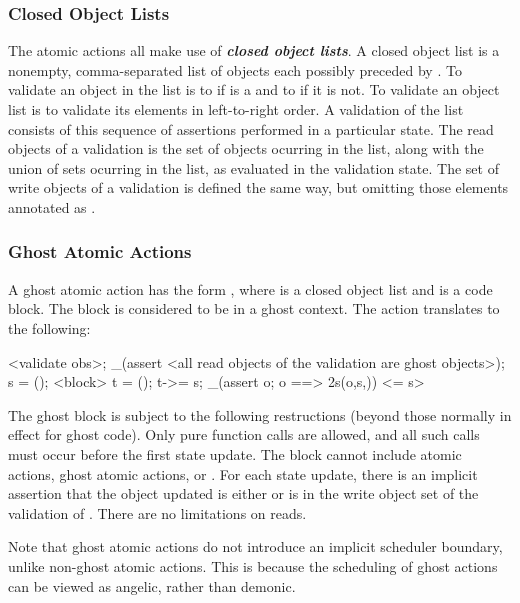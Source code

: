 \documentclass[preprint,nocopyrightspace]{sigplanconf}
\newcommand{\Def}[1]{\textit{\textbf{#1}}}
\begin{document}
{{{\subsubsection{Closed Object Lists}
The atomic actions all make use of \Def{closed object lists}. A closed
object list is a nonempty, comma-separated list of objects
each possibly preceded
by . To validate an object  in the list is to 
 if  is a \vcc{\claim} and to
 if it is not.
To validate an object list is to validate its elements in
left-to-right order. A validation of the list consists of this
sequence of assertions performed in a particular state. The read
objects of a validation is the set of objects ocurring in the list,
along with the union of sets ocurring in the list, as evaluated in the
validation state. The set of write objects of a validation is defined
the same way, but omitting those elements annotated
as .

\subsubsection{Ghost Atomic Actions}
A ghost atomic action has the form ,
where  is a closed object list and  is a code
block. The block is considered to be in a ghost context. 
The action translates to the following:

\begin{VCC}
<validate obs>;
_(assert <all read objects of the validation are ghost objects>);
\state s = \now();
<block>
\state t = \now();
t->\last = s;
_(assert \forall \object o; o 
  ==> \inv2s(o,s,\now))
<\last = s>
\end{VCC}

The ghost block is subject to the following restructions (beyond those
normally in effect for ghost code). Only pure function calls are
allowed, and all such calls must occur before the first state update. The
block cannot include atomic actions, ghost atomic
actions,  or . For each state update,
there is an implicit assertion that the object updated is
either \vcc{\mutable} or is in the write object set of the validation
of . There are no limitations on reads.

Note that ghost atomic actions do not introduce an implicit scheduler
boundary, unlike non-ghost atomic actions. This is because the
scheduling of ghost actions can be viewed as angelic, rather than
demonic.

}}}
\end{document}
